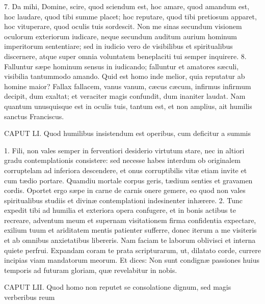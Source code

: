 \documentclass[twoside]{article}
\begin{document}
7. Da mihi, Domine, scire, quod sciendum est, hoc amare, quod amandum est, hoc laudare, quod tibi summe placet; hoc reputare, quod tibi pretiosum apparet, hoc vituperare, quod oculis tuis sordescit. Non me sinas secundum visionem oculorum exteriorum iudicare, neque secundum auditum aurium hominum imperitorum sententiare; sed in iudicio vero de visibilibus et spiritualibus discernere, atque super omnia voluntatem beneplaciti tui semper inquirere.
8. Falluntur sæpe hominum sensus in iudicando; falluntur et amatores sæculi, visibilia tantummodo amando. Quid est homo inde melior, quia reputatur ab homine maior? Fallax fallacem, vanus vanum, cæcus cæcum, infirmus infirmum decipit, dum exaltat; et veraciter magis confundit, dum inaniter laudat. Nam quantum unusquisque est in oculis tuis, tantum est, et non amplius, ait humilis sanctus Franciscus.


CAPUT LI.
Quod humilibus insistendum est operibus, cum deficitur a summis

1. Fili, non vales semper in ferventiori desiderio virtutum stare, nec in altiori gradu contemplationis consistere: sed necesse habes interdum ob originalem corruptelam ad inferiora descendere, et onus corruptibilis vitæ etiam invite et cum tædio portare. Quamdiu mortale corpus geris, tædium senties et gravamen cordis. Oportet ergo sæpe in carne de carnis onere gemere, eo quod non vales spiritualibus studiis et divinæ contemplationi indesinenter inhærere.
2. Tunc expedit tibi ad humilia et exteriora opera confugere, et in bonis actibus te recreare, adventum meum et supernam visitationem firma confidentia expectare, exilium tuum et ariditatem mentis patienter sufferre, donec iterum a me visiteris et ab omnibus anxietatibus libereris. Nam faciam te laborum oblivisci et interna quiete perfrui. Expandam coram te prata scripturarum, ut, dilatato corde, currere incipias viam mandatorum meorum. Et dices: Non sunt condignæ passiones huius temporis ad futuram gloriam, quæ revelabitur in nobis.


CAPUT LII.
Quod homo non reputet se consolatione dignum, sed magis verberibus reum
\end{document}
